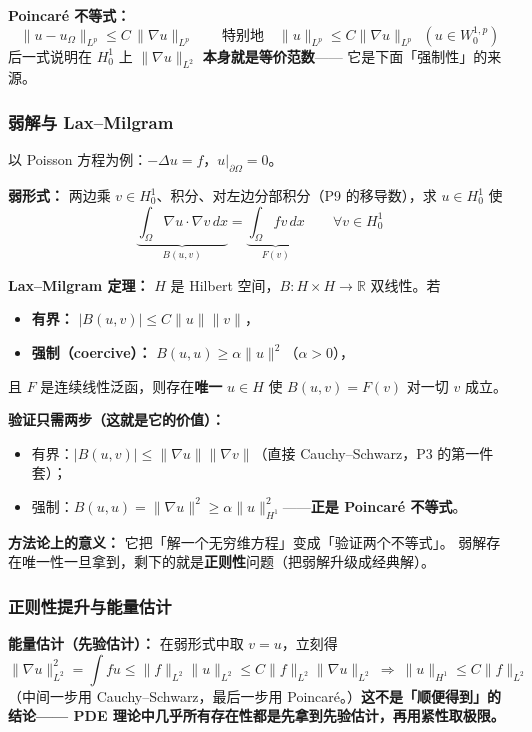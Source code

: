 \textbf{Poincaré 不等式：}
\[
\|u-u_\Omega\|_{L^p}\le C\,\|\nabla u\|_{L^p}\qquad
\text{特别地}\quad \|u\|_{L^p}\le C\|\nabla u\|_{L^p}\ \ (u\in W_0^{1,p})
\]
后一式说明在 $H_0^1$ 上 $\|\nabla u\|_{L^2}$ \textbf{本身就是等价范数}——
它是下面「强制性」的来源。

\subsubsection{弱解与 Lax--Milgram}

以 Poisson 方程为例：$-\Delta u=f$，$u|_{\partial\Omega}=0$。

\textbf{弱形式：} 两边乘 $v\in H_0^1$、积分、对左边分部积分（P9 的移导数），求 $u\in H_0^1$ 使
\[
\underbrace{\int_\Omega\nabla u\cdot\nabla v\,dx}_{B(u,v)}=\underbrace{\int_\Omega fv\,dx}_{F(v)}
\qquad\forall v\in H_0^1
\]

\textbf{Lax--Milgram 定理：} $H$ 是 Hilbert 空间，$B:H\times H\to\mathbb R$ 双线性。若
\begin{itemize}
  \item \textbf{有界：} $|B(u,v)|\le C\|u\|\|v\|$，
  \item \textbf{强制（coercive）：} $B(u,u)\ge\alpha\|u\|^2$（$\alpha>0$），
\end{itemize}
且 $F$ 是连续线性泛函，则存在\textbf{唯一} $u\in H$ 使 $B(u,v)=F(v)$ 对一切 $v$ 成立。

\textbf{验证只需两步（这就是它的价值）：}
\begin{itemize}
  \item 有界：$|B(u,v)|\le\|\nabla u\|\|\nabla v\|$（直接 Cauchy--Schwarz，P3 的第一件套）；
  \item 强制：$B(u,u)=\|\nabla u\|^2\ge\alpha\|u\|_{H^1}^2$——\textbf{正是 Poincaré 不等式}。
\end{itemize}

\textbf{方法论上的意义：} 它把「解一个无穷维方程」变成「验证两个不等式」。
弱解存在唯一性一旦拿到，剩下的就是\textbf{正则性}问题（把弱解升级成经典解）。

\subsubsection{正则性提升与能量估计}

\textbf{能量估计（先验估计）：} 在弱形式中取 $v=u$，立刻得
\[
\|\nabla u\|_{L^2}^2=\int f u\le\|f\|_{L^2}\|u\|_{L^2}\le C\|f\|_{L^2}\|\nabla u\|_{L^2}
\ \Longrightarrow\ \|u\|_{H^1}\le C\|f\|_{L^2}
\]
（中间一步用 Cauchy--Schwarz，最后一步用 Poincaré。）\textbf{这不是「顺便得到」的结论——
PDE 理论中几乎所有存在性都是先拿到先验估计，再用紧性取极限。}


